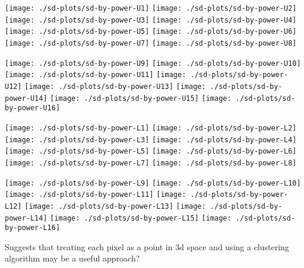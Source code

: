 \documentclass[10pt,fleqn]{article}
\newcommand{\plotsc}{0.12}
\begin{document}
\begin{minipage}{0.48\textwidth}
\flushleft
\texttt{[image: ./sd-plots/sd-by-power-U1]}
\texttt{[image: ./sd-plots/sd-by-power-U2]}
\texttt{[image: ./sd-plots/sd-by-power-U3]}
\texttt{[image: ./sd-plots/sd-by-power-U4]}
\texttt{[image: ./sd-plots/sd-by-power-U5]}
\texttt{[image: ./sd-plots/sd-by-power-U6]}
\texttt{[image: ./sd-plots/sd-by-power-U7]}
\texttt{[image: ./sd-plots/sd-by-power-U8]}
\end{minipage}
%
\vrule
%
\begin{minipage}{0.48\textwidth}
\flushright
\texttt{[image: ./sd-plots/sd-by-power-U9]}
\texttt{[image: ./sd-plots/sd-by-power-U10]}
\texttt{[image: ./sd-plots/sd-by-power-U11]}
\texttt{[image: ./sd-plots/sd-by-power-U12]}
\texttt{[image: ./sd-plots/sd-by-power-U13]}
\texttt{[image: ./sd-plots/sd-by-power-U14]}
\texttt{[image: ./sd-plots/sd-by-power-U15]}
\texttt{[image: ./sd-plots/sd-by-power-U16]}
\end{minipage}

\begin{minipage}{0.48\textwidth}
\flushleft
\texttt{[image: ./sd-plots/sd-by-power-L1]}
\texttt{[image: ./sd-plots/sd-by-power-L2]}
\texttt{[image: ./sd-plots/sd-by-power-L3]}
\texttt{[image: ./sd-plots/sd-by-power-L4]}
\texttt{[image: ./sd-plots/sd-by-power-L5]}
\texttt{[image: ./sd-plots/sd-by-power-L6]}
\texttt{[image: ./sd-plots/sd-by-power-L7]}
\texttt{[image: ./sd-plots/sd-by-power-L8]}
\end{minipage}
%
\vrule
%
\begin{minipage}{0.48\textwidth}
\flushright
\texttt{[image: ./sd-plots/sd-by-power-L9]}
\texttt{[image: ./sd-plots/sd-by-power-L10]}
\texttt{[image: ./sd-plots/sd-by-power-L11]}
\texttt{[image: ./sd-plots/sd-by-power-L12]}
\texttt{[image: ./sd-plots/sd-by-power-L13]}
\texttt{[image: ./sd-plots/sd-by-power-L14]}
\texttt{[image: ./sd-plots/sd-by-power-L15]}
\texttt{[image: ./sd-plots/sd-by-power-L16]}
\end{minipage}

Suggests that treating each pixel as a point in 3d space and using a clustering algorithm may be a useful approach?
\end{document}
